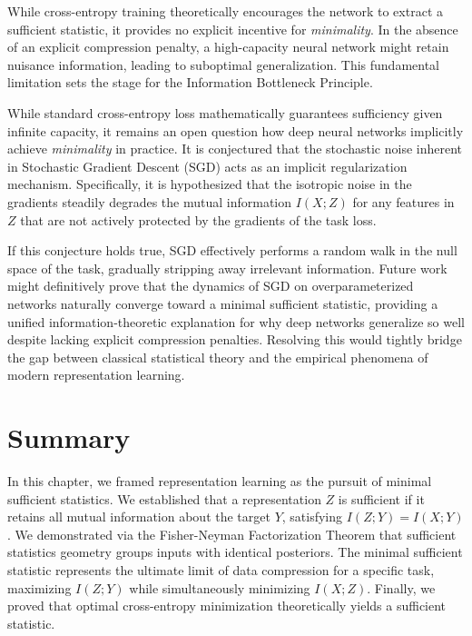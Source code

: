 While cross-entropy training theoretically encourages the network to extract a sufficient statistic, it provides no explicit incentive for \emph{minimality}. In the absence of an explicit compression penalty, a high-capacity neural network might retain nuisance information, leading to suboptimal generalization. This fundamental limitation sets the stage for the Information Bottleneck Principle.

\begin{horizon}
While standard cross-entropy loss mathematically guarantees sufficiency given infinite capacity, it remains an open question how deep neural networks implicitly achieve \emph{minimality} in practice. It is conjectured that the stochastic noise inherent in Stochastic Gradient Descent (SGD) acts as an implicit regularization mechanism. Specifically, it is hypothesized that the isotropic noise in the gradients steadily degrades the mutual information $I(X; Z)$ for any features in $Z$ that are not actively protected by the gradients of the task loss. 

If this conjecture holds true, SGD effectively performs a random walk in the null space of the task, gradually stripping away irrelevant information. Future work might definitively prove that the dynamics of SGD on overparameterized networks naturally converge toward a minimal sufficient statistic, providing a unified information-theoretic explanation for why deep networks generalize so well despite lacking explicit compression penalties. Resolving this would tightly bridge the gap between classical statistical theory and the empirical phenomena of modern representation learning.
\end{horizon}

\section*{Summary}
In this chapter, we framed representation learning as the pursuit of minimal sufficient statistics. We established that a representation $Z$ is sufficient if it retains all mutual information about the target $Y$, satisfying $I(Z; Y) = I(X; Y)$. We demonstrated via the Fisher-Neyman Factorization Theorem that sufficient statistics geometry groups inputs with identical posteriors. The minimal sufficient statistic represents the ultimate limit of data compression for a specific task, maximizing $I(Z;Y)$ while simultaneously minimizing $I(X;Z)$. Finally, we proved that optimal cross-entropy minimization theoretically yields a sufficient statistic.

